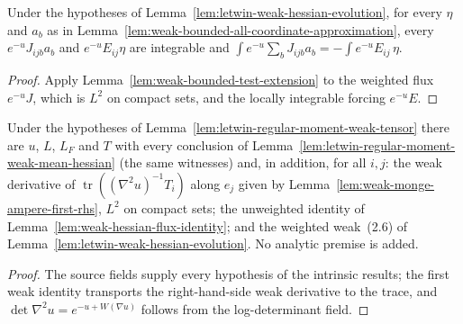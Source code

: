 \begin{lemma}
  \label{lem:letwin-weak-hessian-evolution-bounded-test}
  \leanok
  Under the hypotheses of Lemma~\ref{lem:letwin-weak-hessian-evolution}, for every $\eta$ and $a_b$ as in
  Lemma~\ref{lem:weak-bounded-all-coordinate-approximation}, every $e^{-u}J_{ijb}a_b$ and $e^{-u}E_{ij}\eta$ are integrable and
  $\int e^{-u}\sum_bJ_{ijb}a_b=-\int e^{-u}E_{ij}\,\eta$.
\end{lemma}
\begin{proof}
  \leanok
  Apply Lemma~\ref{lem:weak-bounded-test-extension} to the weighted flux $e^{-u}J$, which is $L^2$ on compact sets, and the locally
  integrable forcing $e^{-u}E$.
\end{proof}

\begin{lemma}
  \label{lem:letwin-regular-moment-weak-hessian-evolution}
  \leanok
  Under the hypotheses of Lemma~\ref{lem:letwin-regular-moment-weak-tensor} there are $u$, $L$, $L_F$ and $T$ with every conclusion of
  Lemma~\ref{lem:letwin-regular-moment-weak-mean-hessian} (the same witnesses) and, in addition, for all $i,j$: the weak derivative of
  $\operatorname{tr}((\nabla^2u)^{-1}T_i)$ along $e_j$ given by Lemma~\ref{lem:weak-monge-ampere-first-rhs}, $L^2$ on compact sets; the
  unweighted identity of Lemma~\ref{lem:weak-hessian-flux-identity}; and the weighted weak~(2.6) of
  Lemma~\ref{lem:letwin-weak-hessian-evolution}. No analytic premise is added.
\end{lemma}
\begin{proof}
  \leanok
  The source fields supply every hypothesis of the intrinsic results; the first weak identity transports the right-hand-side weak
  derivative to the trace, and $\det\nabla^2u=e^{-u+W(\nabla u)}$ follows from the log-determinant field.
\end{proof}

